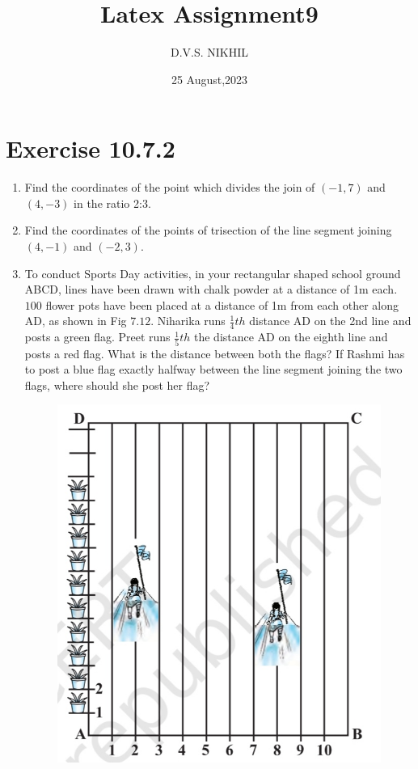 \documentclass{article}
\theoremstyle{remark}
\begin{document}
\title{Latex Assignment9}
\author{D.V.S. NIKHIL}
\date{25 August,2023}
\maketitle
\section*{Exercise 10.7.2}
\begin{enumerate}
\item Find the coordinates of the point which divides the join of $(-1,7)$ and $(4,-3)$ in the ratio 2:3.
\item Find the coordinates of the points of trisection of the line segment joining $(4,-1)$ and $(-2,3)$.
\item To conduct Sports Day activities, in your rectangular shaped school ground ABCD, lines have been drawn with chalk powder at a distance of 1m each. $100$ flower pots have been placed at a distance of 1m from each other along AD, as shown in Fig $7.12$. Niharika runs $\frac {1}{4}th$ distance AD on the 2nd line and posts a green flag. Preet runs $\frac {1}{5}th$ the distance AD on the eighth line and posts a red flag. What is the distance between both the flags? If Rashmi has to post a blue flag exactly halfway between the line segment joining the two flags, where should she post her flag?
\begin{figure}[ht]
\centering
\includegraphics[width=\columnwidth]{figs/7.12.png}

\end{figure}
\end{enumerate}
\end{document}
